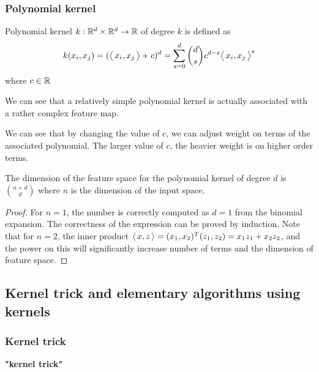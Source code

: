 \begin{refsection}
\subsubsection{Polynomial kernel}
\begin{definition}
	\cite[482]{murphy2012machine}\cite[293]{shawe2004kernel}Polynomial kernel $k:\mathbb{R}^d\times \mathbb{R}^d \to \mathbb{R}$ of degree $k$ is defined as
	$$k(x_i,x_j) = ({\left< \, x_i,x_j \, \right>} + c)^d = \sum_{s=0}^d \binom{d}{s}c^{d-s}{\left< \, x_i,x_j \, \right>}^s$$
	where $c\in \mathbb{R}$
\end{definition}

\begin{remark}
	We can see that a relatively simple polynomial kernel is actually associated with a rather complex feature map. 
\end{remark}

\begin{remark} We can see that by changing the value of $c$, we can adjust weight on terms of the associated polynomial. The larger value of $c$, the heavier weight is on higher order terms.
\end{remark}

\begin{lemma}\cite[293]{shawe2004kernel}
	The dimension of the feature space for the polynomial kernel of degree $d$ is $\binom{n+d}{d}$
	where $n$ is the dimension of the input space.
\end{lemma}
\begin{proof}
	For $n=1$, the number is correctly computed as $d=1$ from the binomial expansion. The correctness of the expression can be proved by induction. Note that for $n=2$, the inner product ${\left< \, x,z \, \right>} = (x_1,x_2)^T(z_1,z_2)=x_1z_1 + x_2z_2$, and the power on this will significantly increase number of terms and the dimension of feature space.
\end{proof}


\subsection{Kernel trick and elementary algorithms using kernels}
\subsubsection{Kernel trick}
\begin{mdframed}
	\textbf{"kernel trick"}
	\cite[34]{scholkopf2002learning}
	

\end{mdframed}
\end{refsection}
